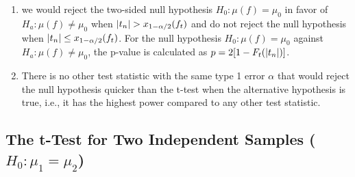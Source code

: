 \begin{enumerate}
    \item we would reject the two-sided null hypothesis $H_0 : \mu( f ) = \mu_0$ in favor of $H_a : \mu( f ) \neq \mu_0$ when $\left| t _n \right| > x_{1-\alpha/2}( f_ t )$ and do not reject the null hypothesis when $\left| t_ n \right| \leq x_{1-\alpha/2}( f_ t )$.
    For the null hypothesis $H_0 : \mu( f ) = \mu_0$ against $H_a : \mu( f ) \neq \mu_0 $, the p-value is calculated as $p = 2[1 - F_t (\left| t_ n \right|)]$.
    \hfill \cite{statistics/book/Statistics-for-Data-Scientists/Maurits-Kaptein}

    \item There is no other test statistic with the same type 1 error $\alpha$ that would reject the null hypothesis quicker than the t-test when the alternative hypothesis is true, i.e., it has the highest power compared to any other test statistic.
    \hfill \cite{statistics/book/Statistics-for-Data-Scientists/Maurits-Kaptein}
\end{enumerate}


\subsection{The t-Test for Two Independent Samples ($H_0:\mu_1=\mu_2$)}

